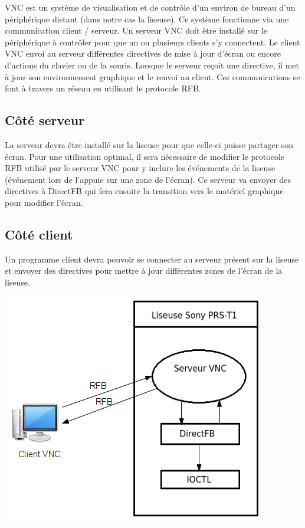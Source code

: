 VNC est un système de visualisation et de contrôle d'un environ de bureau d'un périphérique distant (dans notre cas la liseuse). Ce système fonctionne via une communication client / serveur. Un serveur VNC doit être installé sur le périphérique à contrôler pour que un ou plusieurs clients s'y connectent. Le client VNC envoi au serveur différentes directives de mise à jour d'écran ou encore d'actions du clavier ou de la souris. Lorsque le serveur reçoit une directive, il met à jour son environnement graphique et le renvoi au client. Ces communications se font à travers un réseau en utilisant le protocole RFB.

\subsection{Côté serveur}

La serveur devra être installé sur la liseuse pour que celle-ci puisse partager son écran. Pour une utilisation optimal, il sera nécessaire de modifier le protocole RFB utilisé par le serveur VNC pour y inclure les événements de la liseuse (événement lors de l'appuie sur une zone de l'écran). Ce serveur va envoyer des directives à DirectFB qui fera ensuite la transition vers le matériel graphique pour modifier l'écran.

\subsection{Côté client}

Un programme client devra pouvoir se connecter au serveur présent sur la liseuse et envoyer des directives pour mettre à jour différentes zones de l'écran de la liseuse.

\begin{center}
	\includegraphics{VNCClientServeur.png}
\end{center}

